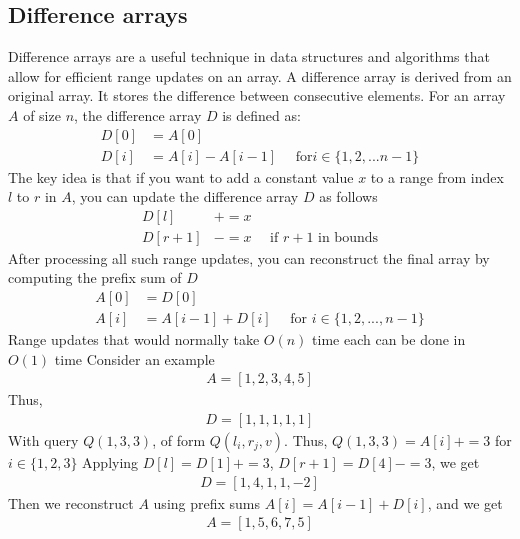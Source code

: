 \documentclass{report}
\begin{document}
    \pagebreak 
    \bigbreak \noindent 
    \subsection{Difference arrays}
    \bigbreak \noindent 
    Difference arrays are a useful technique in data structures and algorithms that allow for efficient range updates on an array.
    \bigbreak \noindent 
    A difference array is derived from an original array. It stores the difference between consecutive elements. For an array $A$ of size $n$, the difference array $D$ is defined as:
    \begin{align*}
        D[0] &= A[0] \\
        D[i] &= A[i] - A[i-1]  \quad \text{ for} i \in \{1,2,...n-1\}
    \end{align*}
    \bigbreak \noindent 
    The key idea is that if you want to add a constant value $x$ to a range from index $l$ to $r$ in $A$, you can update the difference array $D$ as follows
    \begin{align*}
        D[l] &+= x \\
        D[r+1] &-= x \quad \text{ if $r+1$ in bounds}
    \end{align*}
    After processing all such range updates, you can reconstruct the final array by computing the prefix sum of $D$
    \begin{align*}
        A[0] &= D[0] \\
        A[i] &= A[i-1] + D[i] \quad \text{ for } i\in \{1,2,...,n-1\} 
    \end{align*}
    \bigbreak \noindent 
    Range updates that would normally take $O(n)$ time each can be done in $O(1)$ time
    \bigbreak \noindent 
    Consider an example
    \begin{align*}
        A = [1,2,3,4,5]
    \end{align*}
    Thus,
    \begin{align*}
        D = [1,1,1,1,1]
    \end{align*}
    \bigbreak \noindent 
    With query $Q(1,3,3)$, of form $Q(l_{i}, r_{j}, v)$. Thus, $Q(1,3,3)  = A[i]+=3$ for $i\in \{1,2,3\}$
    \bigbreak \noindent 
    Applying $D[l] = D[1] +=3$, $D[r+1]  = D[4]-=3$, we get
    \begin{align*}
        D = [1,4,1,1,-2]
    \end{align*}
    Then we reconstruct $A$ using prefix sums $A[i] = A[i-1] + D[i]$, and we get
    \begin{align*}
        A = [1,5,6,7,5] 
    \end{align*}
\end{document}
